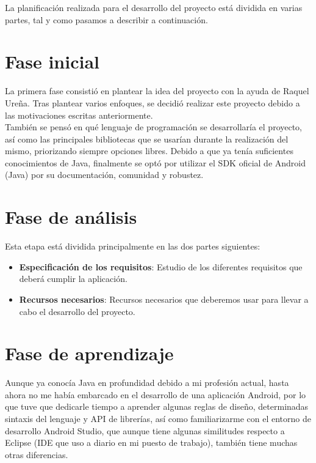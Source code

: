 

La planificación realizada para el desarrollo del proyecto está dividida en varias partes, tal y como pasamos a describir a continuación.

\section{Fase inicial}

La primera fase consistió en plantear la idea del proyecto con la ayuda de Raquel Ureña. Tras plantear varios enfoques, se decidió realizar este proyecto debido a las motivaciones escritas anteriormente.\\

También se pensó en qué lenguaje de programación se desarrollaría el proyecto, así como las principales bibliotecas que se usarían durante la realización del mismo, priorizando siempre opciones libres. Debido a que ya tenía suficientes conocimientos de Java, finalmente se optó por utilizar el SDK oficial de Android (Java) por su documentación, comunidad y robustez.

\section{Fase de análisis}

Esta etapa está dividida principalmente en las dos partes siguientes:

\begin{itemize}
\item \textbf{Especificación de los requisitos}: Estudio de los diferentes requisitos que deberá cumplir la aplicación.
\item \textbf{Recursos necesarios}: Recursos necesarios que deberemos usar para llevar a cabo el desarrollo del proyecto.
\end{itemize}

\section{Fase de aprendizaje}

Aunque ya conocía Java en profundidad debido a mi profesión actual, hasta ahora no me había embarcado en el desarrollo de una aplicación Android, por lo que tuve que dedicarle tiempo a aprender algunas reglas de diseño, determinadas sintaxis del lenguaje y API de librerías, así como familiarizarme con el entorno de desarrollo Android Studio, que aunque tiene algunas similitudes respecto a Eclipse (IDE que uso a diario en mi puesto de trabajo), también tiene muchas otras diferencias.\\

